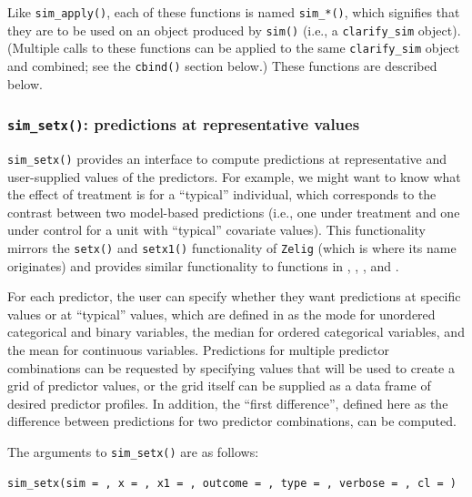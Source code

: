 Like \texttt{sim\_apply()}, each of these functions is named \texttt{sim\_*()}, which signifies that they are to be used on an object produced by \texttt{sim()} (i.e., a \texttt{clarify\_sim} object). (Multiple calls to these functions can be applied to the same \texttt{clarify\_sim} object and combined; see the \texttt{cbind()} section below.) These functions are described below.

\hypertarget{sim_setx-predictions-at-representative-values}{%
\subsubsection{\texorpdfstring{\texttt{sim\_setx()}: predictions at representative values}{sim\_setx(): predictions at representative values}}\label{sim_setx-predictions-at-representative-values}}

\texttt{sim\_setx()} provides an interface to compute predictions at representative and user-supplied values of the predictors. For example, we might want to know what the effect of treatment is for a ``typical'' individual, which corresponds to the contrast between two model-based predictions (i.e., one under treatment and one under control for a unit with ``typical'' covariate values). This functionality mirrors the \texttt{setx()} and \texttt{setx1()} functionality of \texttt{Zelig} (which is where its name originates) and provides similar functionality to functions in , , , and .

For each predictor, the user can specify whether they want predictions at specific values or at ``typical'' values, which are defined in  as the mode for unordered categorical and binary variables, the median for ordered categorical variables, and the mean for continuous variables. Predictions for multiple predictor combinations can be requested by specifying values that will be used to create a grid of predictor values, or the grid itself can be supplied as a data frame of desired predictor profiles. In addition, the ``first difference'', defined here as the difference between predictions for two predictor combinations, can be computed.

The arguments to \texttt{sim\_setx()} are as follows:

\begin{verbatim}
sim_setx(sim = , x = , x1 = , outcome = , type = , verbose = , cl = )
\end{verbatim}


